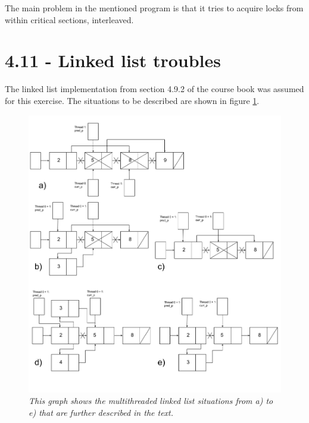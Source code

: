 \documentclass[a4paper,11pt,twoside]{article}
\begin{document}
The main problem in the mentioned program is that it tries to acquire locks from within critical sections, interleaved.

\section{4.11 - Linked list troubles}
The linked list implementation from section 4.9.2 of the course book was assumed for this exercise. The situations to be described are shown in figure \ref{fig:llist}.

\begin{figure}

  \centering
  \includegraphics[width=1\textwidth]{linked_list.png}
  \caption{\textit{This graph shows the multithreaded linked list situations from a) to e) that are further described in the text.}}
  \label{fig:llist}
\end{figure}
\end{document}
